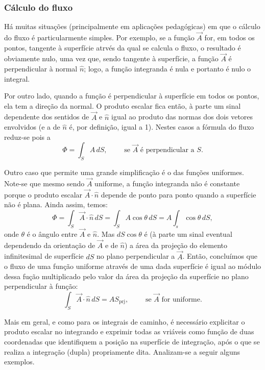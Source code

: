 \subsubsection*{Cálculo do fluxo}
Há muitas situações (principalmente em aplicações pedagógicas) em que o cálculo
do fluxo é particularmente simples. Por exemplo, se a função $\vec A$ for, em
todos os pontos, tangente à superfície atrvés da qual se calcula o fluxo, o
resultado é obviamente nulo, uma vez que, sendo tangente à superfície, a função
$\vec A$ é perpendicular à normal $\hat n$; logo, a função integranda é nula e
portanto é nulo o integral.

Por outro lado, quando a função é perpendicular à superfície em todos os pontos,
ela tem a direção da normal. O produto escalar fica então, à parte um sinal
dependente dos sentidos de $\vec A$ e $\hat n$ igual ao produto das
normas dos dois vetores envolvidos (e a de $\hat n$ é, por definição, igual a
1). Nestes casos a fórmula do fluxo reduz-se pois a 
\begin{equation*}
\Phi = \int_S A\,dS,\qquad\text{ se $\vec A$ é perpendicular a $S$.}
\end{equation*}

Outro caso que permite uma grande simplificação é o das funções uniformes.
Note-se que mesmo sendo $\vec A$ uniforme, a função integranda não é constante
porque o produto escalar $\vec A\cdot \hat n$ depende de ponto para ponto quando
a superfície não é plana. Ainda assim, temos:
\begin{equation*}
\Phi=\int_S\vec A\cdot\hat n\,dS=\int_S A\cos\theta\,dS=A\int_s\cos\theta\,dS,
\end{equation*}
onde $\theta$ é o ângulo entre $\vec A$ e $\hat n$. Mas $dS \cos\theta$ é (à
parte um sinal eventual dependendo da orientação de $\vec A$ e de $\hat n$) a área
da projeção do elemento infinitesimal de superfície $dS$ no plano perpendicular
a $\vec A$. Então, concluímos que o fluxo de uma função uniforme através de uma
dada superfície é igual ao módulo dessa fução multiplicado pelo valor da área da
projeção da superfície no plano perpendicular à função:
\begin{equation*}
\int_S\vec A\cdot\hat n\,dS= AS_{\text{prj}},\qquad\text{ se $\vec A$ for
uniforme.}
\end{equation*}

Mais em geral, e como para os integrais de caminho, é necessário explicitar o
produto escalar no integrando e exprimir todas as vriáveis como função de duas 
coordenadas que identifiquem a posição na superfície de integração, após o que
se realiza a integração (dupla) propriamente dita. Analizam-se a seguir alguns
exemplos.


